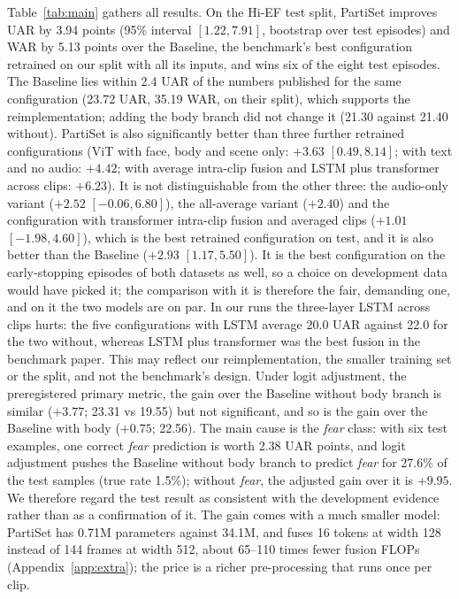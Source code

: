 \documentclass[11pt]{article}
\newcommand{\model}{PartiSet}
\begin{document}
Table~\ref{tab:main} gathers all results. On the Hi-EF test split, \model{} improves UAR by 3.94 points (95\% interval
$[1.22, 7.91]$, bootstrap over test episodes) and WAR by 5.13 points over the Baseline, the benchmark's best
configuration retrained on our split with all its inputs, and wins six of the eight test episodes. The Baseline lies
within 2.4 UAR of the numbers published for the same configuration (23.72 UAR, 35.19 WAR, on their split), which supports
the reimplementation; adding the body branch did not change it (21.30 against 21.40 without). \model{} is also
significantly better than three further retrained configurations (ViT with face, body and scene only: $+3.63$
$[0.49, 8.14]$; with text and no audio: $+4.42$; with average intra-clip fusion and LSTM plus transformer across clips:
$+6.23$). It is not distinguishable from the other three: the audio-only variant ($+2.52$ $[-0.06, 6.80]$), the all-average
variant ($+2.40$) and the configuration with transformer intra-clip fusion and averaged clips ($+1.01$
$[-1.98, 4.60]$), which is the best retrained configuration on test, and it is also better than the Baseline ($+2.93$ $[1.17, 5.50]$). It
is the best configuration on the early-stopping episodes of both datasets as well, so a choice on development data would
have picked it; the comparison with it is therefore the fair, demanding one, and on it the two models are on par. In our
runs the three-layer LSTM across clips hurts: the five configurations with LSTM average 20.0 UAR against 22.0 for the two
without, whereas LSTM plus transformer was the best fusion in the benchmark paper. This may reflect our reimplementation,
the smaller training set or the split, and not the benchmark's design. Under logit
adjustment, the preregistered primary metric, the gain over the Baseline without body branch is similar ($+3.77$; 23.31 vs
19.55) but not significant, and so is the gain over the Baseline with body ($+0.75$; 22.56). The main cause is the
\emph{fear} class: with six test examples, one correct \emph{fear} prediction is worth 2.38 UAR points, and logit
adjustment pushes the Baseline without body branch to predict \emph{fear} for 27.6\% of the test samples (true rate
1.5\%); without \emph{fear}, the adjusted gain over it is $+9.95$. We therefore regard the test result as consistent with
the development evidence rather than as a confirmation of it. The gain comes with a much smaller model: \model{} has
0.71M parameters against 34.1M, and fuses 16 tokens at width 128 instead of 144 frames at width 512, about 65--110 times
fewer fusion FLOPs (Appendix~\ref{app:extra}); the price is a richer pre-processing that runs once per clip.
\end{document}
